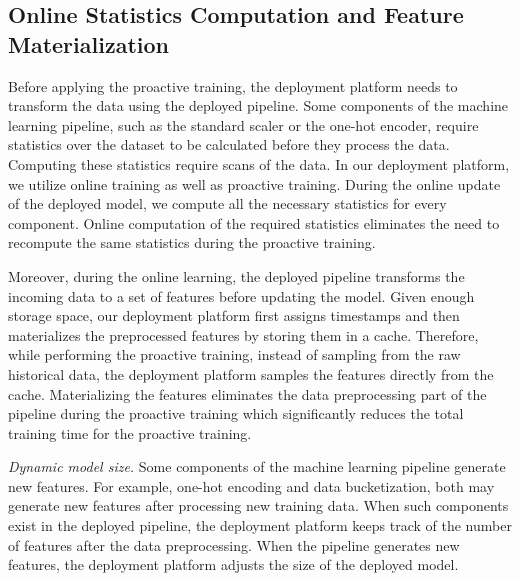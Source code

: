 \subsection{Online Statistics Computation and Feature Materialization}
Before applying the proactive training, the deployment platform needs to transform the data using the deployed pipeline.
Some components of the machine learning pipeline, such as the standard scaler or the one-hot encoder, require statistics over the dataset to be calculated before they process the data.
Computing these statistics require scans of the data.
In our deployment platform, we utilize online training as well as proactive training.
During the online update of the deployed model, we compute all the necessary statistics for every component.
Online computation of the required statistics eliminates the need to recompute the same statistics during the proactive training.

Moreover, during the online learning, the deployed pipeline transforms the incoming data to a set of features before updating the model.
Given enough storage space, our deployment platform first assigns timestamps and then materializes the preprocessed features by storing them in a cache.
Therefore, while performing the proactive training, instead of sampling from the raw historical data, the deployment platform samples the features directly from the cache.
Materializing the features eliminates the data preprocessing part of the pipeline during the proactive training which significantly reduces the total training time for the proactive training.

\textit{Dynamic model size.}
Some components of the machine learning pipeline generate new features.
For example, one-hot encoding and data bucketization, both may generate new features after processing new training data.
When such components exist in the deployed pipeline, the deployment platform keeps track of the number of features after the data preprocessing.
When the pipeline generates new features, the deployment platform adjusts the size of the deployed model.
